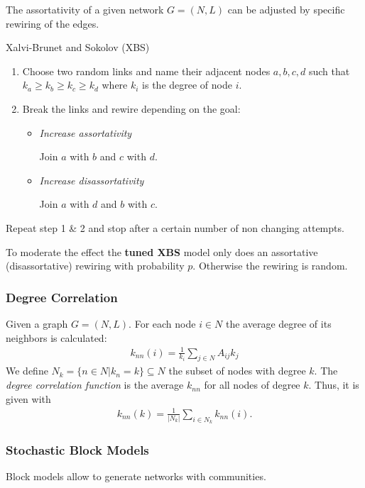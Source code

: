 \documentclass[english]{panikzettel}
\begin{document}
The assortativity of a given network $ G = (N,L) $ can be adjusted by specific rewiring of the edges.

\begin{algo}{Xalvi-Brunet and Sokolov (XBS)}
\begin{enumerate}
	\item Choose two random links and name their adjacent nodes $ a,b,c,d $ such that $ k_a \geq k_b \geq k_c \geq k_d $ where $ k_i $ is the degree of node $ i $.
	\item Break the links and rewire depending on the goal:
	\begin{itemize}
		\item \textit{Increase assortativity}

		Join $ a $ with $ b $ and $ c $ with $ d $.

		\item \textit{Increase disassortativity}

		Join $ a $ with $ d $ and $ b $ with $ c $.
	\end{itemize}
\end{enumerate}
Repeat step 1 \& 2  and stop after a certain number of non changing attempts.
\end{algo}

To moderate the effect the \textbf{tuned XBS} model only does an assortative (disassortative) rewiring with probability $ p $.
Otherwise the rewiring is random.

\subsubsection{Degree Correlation}
Given a graph $ G = (N,L) $.
For each node $ i \in N $ the average degree of its neighbors is calculated:
\begin{align*}
	k_{nn} (i) = \frac{1}{k_i} \sum\limits_{j \in N} A_{ij} k_j
\end{align*}
We define $ N_k = \{n \in N | k_n = k\} \subseteq N $ the subset of nodes with degree $ k $.
The \textit{degree correlation function} is the average $ k_{nn} $ for all nodes of degree $ k $.
Thus, it is given with
\begin{align*}
	k_{nn}(k) = \frac{1}{|N_k|} \sum\limits_{i \in N_k} k_{nn}(i).
\end{align*}

\subsubsection{Stochastic Block Models}
Block models allow to generate networks with communities.
\end{document}
